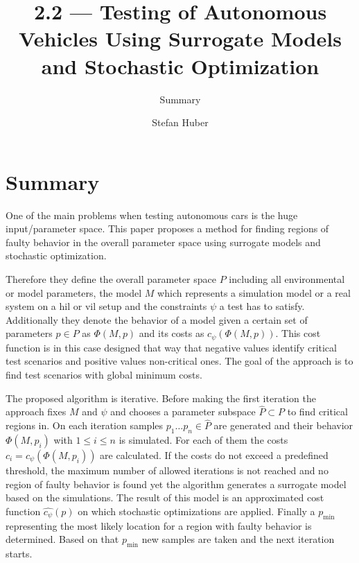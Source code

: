 \documentclass[oneside, notitlepage, twocolumn]{scrartcl}
\title{\LARGE 2.2 --- Testing of Autonomous Vehicles Using Surrogate Models and Stochastic Optimization}
\subtitle{Summary}
\author{Stefan Huber}
\begin{document}
\maketitle

\section{Summary}
One of the main problems when testing autonomous cars is the huge input/parameter space.
This paper proposes a method for finding regions of faulty behavior in the overall parameter space using surrogate models and stochastic optimization.\par
Therefore they define the overall parameter space \(P\) including all environmental or model parameters, the model \(M\) which represents a simulation model or a real system on a \gls{hil} or \gls{vil} setup and the constraints \(\psi\) a test has to satisfy.
Additionally they denote the behavior of a model given a certain set of parameters \(p\in P\) as \(\Phi (M, p)\) and its costs as \(c_\psi(\Phi(M, p))\).
This cost function is in this case designed that way that negative values identify critical test scenarios and positive values non-critical ones.
The goal of the approach is to find test scenarios with global minimum costs.\par
The proposed algorithm is iterative.
Before making the first iteration the approach fixes \(M\) and \(\psi\) and chooses a parameter subspace \(\hat{P}\subset P\) to find critical regions in.
On each iteration samples \(p_1\ldots p_n\in \hat{P}\) are generated and their behavior \(\Phi (M, p_i)\) with \(1 \leq i \leq n\) is simulated.
For each of them the costs \(c_i=c_\psi(\Phi(M, p_i))\) are calculated.
If the costs do not exceed a predefined threshold, the maximum number of allowed iterations is not reached and no region of faulty behavior is found yet the algorithm generates a surrogate model based on the simulations.
The result of this model is an approximated cost function \(\hat{c_\psi}(p)\) on which stochastic optimizations are applied.
Finally a \(p_\min\) representing the most likely location for a region with faulty behavior is determined.
Based on that \(p_\min\) new samples are taken and the next iteration starts.
\end{document}
